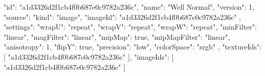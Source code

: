 {
  "id": "a1d3326d2f1cb4f0b687e0c9782a236c",
  "name": "Well Normal",
  "version": 1,
  "source": {
    "kind": "image",
    "imageId": "a1d3326d2f1cb4f0b687e0c9782a236c"
  },
  "settings": {
    "wrapU": "repeat",
    "wrapV": "repeat",
    "wrapW": "repeat",
    "minFilter": "linear",
    "magFilter": "linear",
    "mipMap": true,
    "mipMapFilter": "linear",
    "anisotropy": 1,
    "flipY": true,
    "precision": "low",
    "colorSpace": "srgb"
  },
  "textureIds": [
    "a1d3326d2f1cb4f0b687e0c9782a236c"
  ],
  "imageIds": [
    "a1d3326d2f1cb4f0b687e0c9782a236c"
  ]
}

